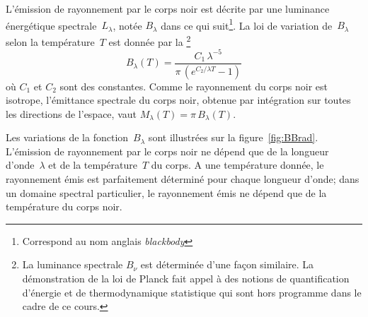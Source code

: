 \sk
L'émission de rayonnement par le corps noir est décrite par une luminance énergétique spectrale~$L_{\lambda}$, notée $B_\lambda$ dans ce qui suit\footnote{Correspond au nom anglais \emph{blackbody}}. La loi de variation de~$B_\lambda$ selon la température~$T$ est donnée par la \footnote{La luminance spectrale $B_\nu$ est déterminée d'une façon similaire. La démonstration de la loi de Planck fait appel à des notions de quantification d'énergie et de thermodynamique statistique qui sont hors programme dans le cadre de ce cours.} $$ B_\lambda(T) = \frac{C_1 \, \lambda^{-5}}{\pi \, \left( e^{ C_2 / \lambda T}-1\right) } $$ où $C_1$ et $C_2$ sont des constantes. Comme le rayonnement du corps noir est isotrope, l'émittance spectrale du corps noir, obtenue par intégration sur toutes les directions de l'espace, vaut $ M_\lambda(T) = \pi \, B_\lambda(T) $. 


\sk
Les variations de la fonction~$B_\lambda$ sont illustrées sur la figure~\ref{fig:BBrad}. L'émission de rayonnement par le corps noir ne dépend que de la longueur d'onde~$\lambda$ et de la température~$T$ du corps. A une température donnée, le rayonnement émis est parfaitement déterminé pour chaque longueur d'onde; dans un domaine spectral particulier, le rayonnement émis ne dépend que de la température du corps noir.


